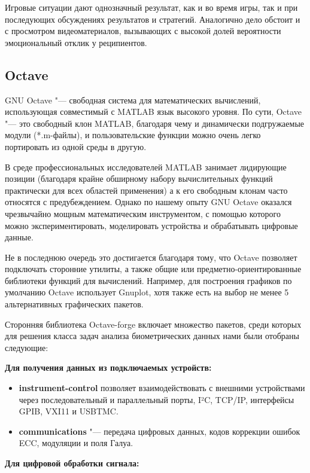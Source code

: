 \documentclass[10pt, a5paper]{article}
\begin{document}
Игровые ситуации дают однозначный результат, как и во время игры, так и при последующих обсуждениях результатов и стратегий. Аналогично дело обстоит и с просмотром видеоматериалов, вызывающих с высокой долей вероятности эмоциональный отклик у реципиентов.

\subsection*{Octave}

GNU Octave "--- свободная система для математических вычислений, использующая совместимый с MATLAB язык высокого уровня.
По сути, Octave "--- это свободный клон MATLAB, благодаря чему и динамически подгружаемые модули (*.m-файлы), и пользовательские функции можно очень легко портировать из одной среды в другую.

В среде профессиональных исследователей MATLAB занимает лидирующие позиции (благодаря крайне обширному набору вычислительных функций практически для всех областей применения) а к его свободным клонам часто относятся с предубеждением. Однако по нашему опыту GNU Octave оказался чрезвычайно мощным математическим инструментом, с помощью которого можно экспериментировать, моделировать устройства и обрабатывать цифровые данные.

Не в последнюю очередь это достигается благодаря тому, что Octave позволяет подключать сторонние утилиты, а также общие или предметно-ориентированные библиотеки функций для вычислений. 
Например, для построения графиков по умолчанию Octave использует Gnuplot, хотя также есть на выбор не менее 5 альтернативных графических пакетов.

Сторонняя библиотека Octave-forge включает множество пакетов, среди которых для решения класса задач анализа биометрических данных нами были отобраны следующие:

\textbf{Для получения данных из подключаемых устройств:}

\begin{itemize}
  \item \textbf{instrument-control} позволяет взаимодействовать с внешними устройствами через последовательный и параллельный порты, I²C, TCP/IP, интерфейсы GPIB, VXI11 и USBTMC.
  \item \textbf{communications} "--- передача цифровых данных, кодов коррекции ошибок ECC, модуляции и поля Галуа.
\end{itemize}

\textbf{Для цифровой обработки сигнала:}
\end{document}
